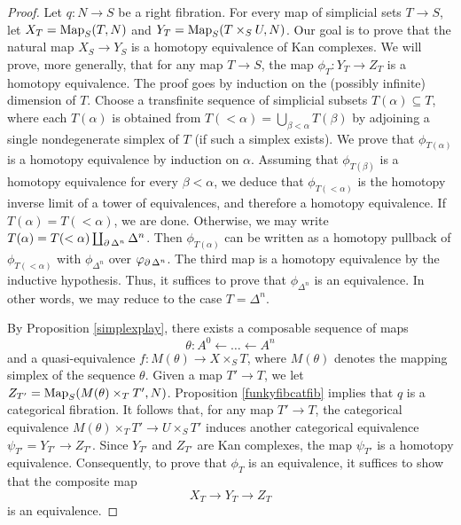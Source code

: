 \begin{proof}
Let $q: N \rightarrow S$ be a right fibration. For every map of simplicial sets $T \rightarrow S$,
let $X_{T} = \operatorname{{Map}}_{S}(T,N)$ and $Y_{T} = \operatorname{{Map}}_{S}(T \times_{S} U, N)$. Our goal is to prove that the natural map $X_{S} \rightarrow Y_{S}$ is a homotopy equivalence of Kan complexes.
We will prove, more generally, that for any map $T \rightarrow S$, the map
$\phi_{T}: Y_{T} \rightarrow Z_{T}$ is a homotopy equivalence. The proof goes by induction on the
(possibly infinite) dimension of $T$. Choose a transfinite sequence of simplicial
subsets $T(\alpha) \subseteq T$, where each $T(\alpha)$ is obtained from
$T(< \alpha) = \bigcup_{\beta < \alpha} T(\beta)$ by adjoining a single nondegenerate simplex
of $T$ (if such a simplex exists). We prove that $\phi_{T(\alpha)}$ is a homotopy equivalence
by induction on $\alpha$. Assuming that $\phi_{T(\beta)}$ is a homotopy equivalence for every
$\beta < \alpha$, we deduce that $\phi_{T(< \alpha)}$ is the homotopy inverse limit of a tower of equivalences, and therefore a homotopy equivalence. If $T(\alpha) = T(< \alpha)$, we are done. Otherwise, we may write $T(\alpha) = T(< \alpha) \coprod_{ \operatorname{\partial} \Delta^n} \Delta^n$. Then
$\phi_{T(\alpha)}$ can be written as a homotopy pullback of $\phi_{T(< \alpha)}$ with
$\phi_{\Delta^n}$ over $\varphi_{ \operatorname{\partial} \Delta^n}$. The third map is a homotopy equivalence
by the inductive hypothesis. Thus, it suffices to prove that $\phi_{\Delta^n}$ is an equivalence.
In other words, we may reduce to the case $T = \Delta^n$.

By Proposition \ref{simplexplay}, there exists a composable sequence of maps
$$ \theta: A^0 \leftarrow \ldots \leftarrow A^n$$
and a quasi-equivalence $f: M(\theta) \rightarrow X \times_{S} T$, where
$M(\theta)$ denotes the mapping simplex of the sequence $\theta$. 
Given a map $T' \rightarrow T$, we let $Z_{T'} = \operatorname{{Map}}_{S}(M(\theta) \times_{T} T', N)$. 
Proposition \ref{funkyfibcatfib} implies that $q$ is a categorical fibration. It follows that, for
any map $T' \rightarrow T$, the categorical equivalence 
$M(\theta) \times_{T} T' \rightarrow U \times_{S} T'$ induces another categorical equivalence
$\psi_{T'} = Y_{T'} \rightarrow Z_{T'}$. Since $Y_{T'}$ and $Z_{T'}$ are Kan complexes, the map $\psi_{T'}$ is a homotopy equivalence. Consequently, to prove that $\phi_{T}$ is an equivalence, it suffices to show that the composite map
$$ X_{T} \rightarrow Y_{T} \rightarrow Z_{T}$$ is an equivalence.


\end{proof}
